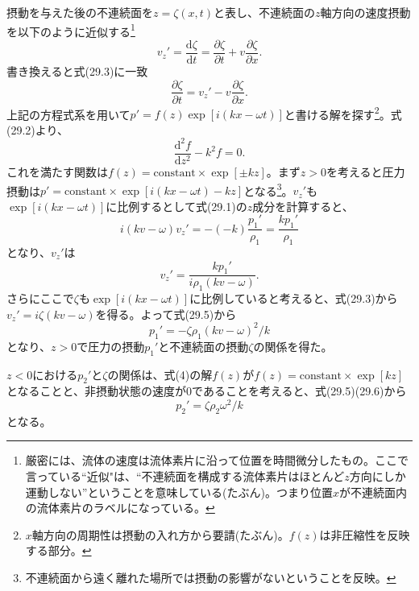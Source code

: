 \documentclass[11pt,a4paper]{jsarticle}
\begin{document}
摂動を与えた後の不連続面を$z=\zeta(x,t)$と表し、不連続面の$z$軸方向の速度摂動を以下のように近似する\footnote{厳密には、流体の速度は流体素片に沿って位置を時間微分したもの。ここで言っている“近似"は、“不連続面を構成する流体素片はほとんど$z$方向にしか運動しない”ということを意味している(たぶん)。つまり位置$x$が不連続面内の流体素片のラベルになっている。}
\begin{equation}
v_z'=\frac{\mathrm{d}\zeta}{\mathrm{d}t}=\frac{\partial \zeta}{\partial t}+v\frac{\partial \zeta}{\partial x}.
\end{equation}
書き換えると式(29.3)に一致
\begin{equation}
\frac{\partial \zeta}{\partial t}=v_z'-v\frac{\partial \zeta}{\partial x}.\tag{29.3}
\end{equation}
上記の方程式系を用いて$p'=f(z)\exp{[i(kx-\omega t)]}$と書ける解を探す\footnote{$x$軸方向の周期性は摂動の入れ方から要請(たぶん)。$f(z)$は非圧縮性を反映する部分。}。式(29.2)より、
\begin{equation}
\frac{\mathrm{d}^2f}{\mathrm{d}z^2}-k^2f=0.
\end{equation}
これを満たす関数は$f(z)=\mathrm{constant}\times \exp{[\pm kz]}$。まず$z>0$を考えると圧力摂動は$p'=\mathrm{constant}\times\exp{[i(kx-\omega t)-kz]}$となる\footnote{不連続面から遠く離れた場所では摂動の影響がないということを反映。}。$v_z'$も$\exp{[i(kx-\omega t)]}$に比例するとして式(29.1)の$z$成分を計算すると、
\begin{equation}
i(kv-\omega)v_z'=-(-k)\frac{p_1'}{\rho_1}=\frac{kp_1'}{\rho_1}
\end{equation}
となり、$v_z'$は
\begin{equation}
v_z'=\frac{kp_1'}{i\rho_1(kv-\omega)}.\tag{29.5}
\end{equation}
さらにここで$\zeta$も$\exp{[i(kx-\omega t)]}$に比例していると考えると、式(29.3)から$v_z'=i\zeta(kv-\omega)$を得る。よって式(29.5)から
\begin{equation}
p_1'=-\zeta\rho_1(kv-\omega)^2/k\tag{29.6}
\end{equation}
となり、$z>0$で圧力の摂動$p_1'$と不連続面の摂動$\zeta$の関係を得た。

$z<0$における$p_2'$と$\zeta$の関係は、式(4)の解$f(z)$が$f(z)=\mathrm{constant}\times\exp{[kz]}$となることと、非摂動状態の速度が0であることを考えると、式(29.5)(29.6)から
\begin{equation}
p_2'=\zeta\rho_2\omega^2/k\tag{29.7}
\end{equation}
となる。
\end{document}
